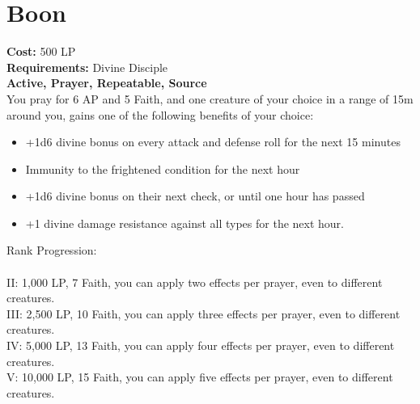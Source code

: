\section{Boon}\label{prayer:boon}
\textbf{Cost:} 500 LP\\
\textbf{Requirements:} Divine Disciple \\
\textbf{Active, Prayer, Repeatable, Source}\\
You pray for 6 AP and 5 Faith, and one creature of your choice in a range of 15m around you, gains one of the following benefits of your choice:
\begin{itemize}
	\item +1d6 divine bonus on every attack and defense roll for the next 15 minutes
	\item Immunity to the frightened condition for the next hour
	\item +1d6 divine bonus on their next check, or until one hour has passed
	\item +1 divine damage resistance against all types for the next hour.
\end{itemize}

Rank Progression:\\
\\
II: 1,000 LP, 7 Faith, you can apply two effects per prayer, even to different creatures.\\
III: 2,500 LP, 10 Faith, you can apply three effects per prayer, even to different creatures.\\
IV: 5,000 LP, 13 Faith, you can apply four effects per prayer, even to different creatures.\\
V: 10,000 LP, 15 Faith, you can apply five effects per prayer, even to different creatures.\\